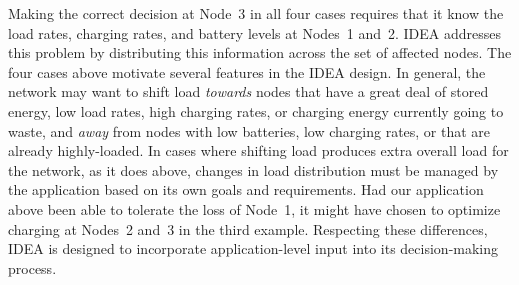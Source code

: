 Making the correct decision at Node~3 in all four cases requires that it know
the load rates, charging rates, and battery levels at Nodes~1 and~2. IDEA
addresses this problem by distributing this information across the set of
affected nodes. The four cases above motivate several features in the IDEA
design. In general, the network may want to shift load \textit{towards} nodes
that have a great deal of stored energy, low load rates, high charging rates,
or charging energy currently going to waste, and \textit{away} from nodes
with low batteries, low charging rates, or that are already highly-loaded. In
cases where shifting load produces extra overall load for the network, as it
does above, changes in load distribution must be managed by the application
based on its own goals and requirements. Had our application above been able
to tolerate the loss of Node~1, it might have chosen to optimize charging at
Nodes~2 and~3 in the third example. Respecting these differences, IDEA is
designed to incorporate application-level input into its decision-making
process.
